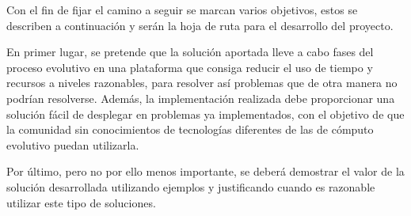 Con el fin de fijar el camino a seguir se marcan varios objetivos, estos se describen a continuación y serán la hoja de ruta para el desarrollo del proyecto.

En primer lugar, se pretende que la soluci\'on aportada lleve a cabo fases del proceso evolutivo en una plataforma que consiga reducir el uso de tiempo y recursos a niveles razonables, para resolver as\'i problemas que de otra manera no podrían resolverse. Adem\'as, la implementaci\'on realizada debe proporcionar una solución fácil de desplegar en problemas ya implementados, con el objetivo de que la comunidad sin conocimientos de tecnologías diferentes de las de cómputo evolutivo puedan utilizarla.

Por \'ultimo, pero no por ello menos importante, se deber\'a demostrar el valor de la soluci\'on desarrollada utilizando ejemplos y justificando cuando es razonable utilizar este tipo de soluciones.